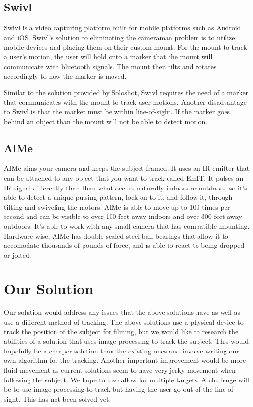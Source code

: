 \documentclass[12pt]{article}
\begin{document}
\subsection{Swivl}
Swivl is a video capturing platform built for mobile platforms such as Android and iOS. Swivl’s solution to eliminating the cameraman problem is to utilize mobile devices and placing them on their custom mount. For the mount to track a user’s motion, the user will hold onto a marker that the mount will communicate with bluetooth signals. The mount then tilts and rotates accordingly to how the marker is moved.
\par
Similar to the solution provided by Soloshot, Swivl requires the need of a marker that communicates with the mount to track user motions. Another disadvantage to Swivl is that the marker must be within line-of-sight. If the marker goes behind an object than the mount will not be able to detect motion.

\subsection{AlMe}
AIMe aims your camera and keeps the subject framed. It uses an IR emitter that can be attached to any object that you want to track called EmIT. It pulses an IR signal differently than than what occurs naturally indoors or outdoors, so it's able to detect a unique pulsing pattern, lock on to it, and follow it, through tilting and swiveling the motors. AIMe is able to move up to 100 times per second and can be visible to over 100 feet away indoors and over 300 feet away outdoors. It's able to work with any small camera that has compatible mounting. Hardware wise, AIMe has double-sealed steel ball bearings that allow it to accomodate thousands of pounds of force, and is able to react to being dropped or jolted.

\section{Our Solution}
Our solution would address any issues that the above solutions have as well as use a different method of tracking. The above solutions use a physical device to track the position of the subject for filming, but we would like to research the abilities of a solution that uses image processing to track the subject. This would hopefully be a cheaper solution than the existing ones and involve writing our own algorithm for the tracking. Another important improvement would be more fluid movement as current solutions seem to have very jerky movement when following the subject. We hope to also allow for multiple targets. A challenge will be to use image processing to track but having the user go out of the line of sight. This has not been solved yet.
\end{document}

